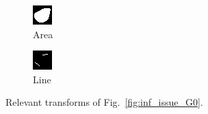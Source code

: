 \documentclass[conference]{IEEEtran}
\begin{document}
\begin{figure}[h]
\begin{subfigure}{.20\columnwidth}
    \end{subfigure}%
    \begin{subfigure}{.20\columnwidth}
        \centering
        \includegraphics[width=.90\textwidth]{./images/issues/excluded-G-0-area.png}
        \caption{Area}
    \end{subfigure}%
    \begin{subfigure}{.20\columnwidth}
        \centering
        \includegraphics[width=.90\textwidth]{./images/issues/excluded-G-0-line.png}
        \caption{Line}
    \end{subfigure}
    \caption{Relevant transforms of Fig.~\ref{fig:inf_issue_G0}.}
    \label{fig:g0_trans}
\end{figure}
\end{document}
